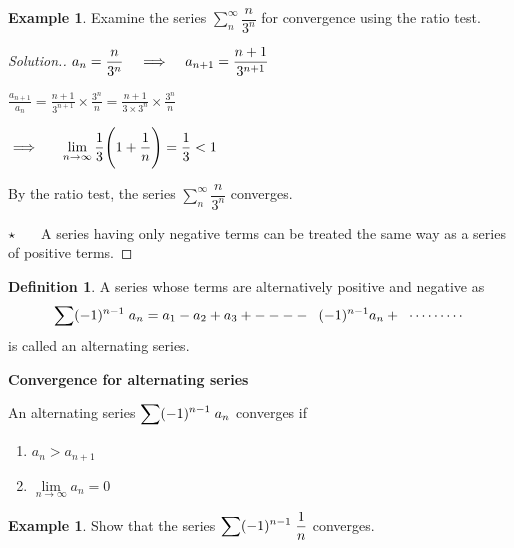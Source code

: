 \documentclass[11pt,a4paper]{article}
\theoremstyle{definition}
\newtheorem{defn}[thm]{Definition}
\newtheorem{exa}[thm]{Example}
\newenvironment{solution}
  {\renewcommand{\qedsymbol}{}\begin{proof}[\textit{Solution}.]}
  {\end{proof}}
\newcommand{\subhead}[1]{%
  \par\medskip\noindent\textbf{#1}\par\nobreak\smallskip}
\begin{document}
\begin{exa}
Examine the series $\displaystyle{\sum_n^{\infty} \dfrac{n}{3^n}}$ for convergence using the ratio test.
\end{exa}

\begin{solution}

$\displaystyle{a_n = \dfrac{n}{3^n} \hspace{0.3cm} \implies\hspace{0.3cm} a_{n+1} = \dfrac{n + 1}{3^{n+ 1}}}$

$\displaystyle{ \frac{a_{n+1}}{a_n} = \frac{n+ 1}{3^{n + 1}} \times \frac{3^n}{n} = \frac{n+1}{3\times 3^n}\times \frac{3^n}{n}}$

$\displaystyle{\implies\hspace{0.5cm} \lim\limits_{n\rightarrow \infty} \frac{1}{3}\Bigg(1 + \frac{1}{n}\Bigg) = \frac{1}{3}< 1}$

By the ratio test, the series $\displaystyle{\sum_n^{\infty} \dfrac{n}{3^n}}$ converges.

$\star\hspace{0.5cm}$ A series having only negative terms can be treated the same way as a series of positive terms.
\end{solution}

\begin{defn}
A series whose terms are alternatively positive and negative as $$\sum (-1)^{n-1} \hspace{0.1cm} a_n = a_1 - a_2 + a_3 + ----\hspace{0.2cm} (-1)^{n-1}a_n+ \hspace{0.2cm}\cdots\cdots\cdots$$ is called an alternating series.

\pagebreak
\end{defn}
\subhead{Convergence for alternating series}

An alternating series $\displaystyle{\sum (-1)^{n-1} \hspace{0.1cm} a_n}$ converges if
\begin{enumerate}
    \item[$i$.] $a_n > a_{n + 1}$

    \item[$ii$.] $\lim\limits_{n \rightarrow \infty} a_n = 0$
\end{enumerate}

\begin{exa}
Show that the series $\displaystyle{\sum (-1)^{n-1}\hspace{0.1cm}\frac{1}{n}}$ converges.
\end{exa}
\end{document}
